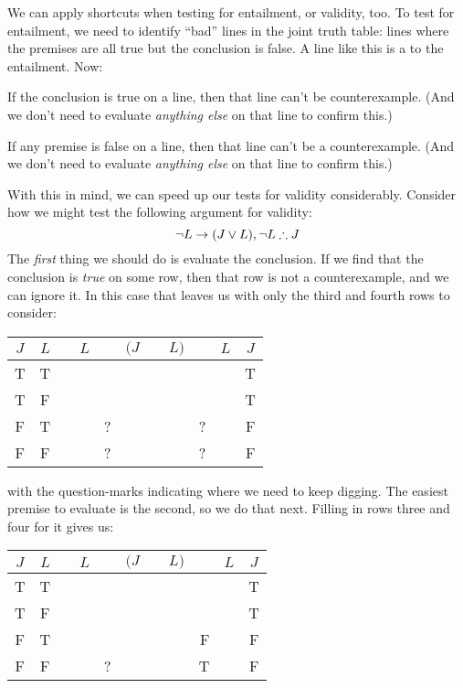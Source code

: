 We can apply shortcuts when testing for entailment, or validity, too. To test for entailment, we need to identify ``bad'' lines in the joint truth table: lines where the premises are all true but the conclusion is false.  A line like this is a  to the entailment. Now:\begin{earg}
	\item[\textbullet] If the conclusion is true on a line, then that line can't be counterexample. (And we don't need to evaluate \emph{anything else} on that line to confirm this.)
	\item[\textbullet] If any premise is false on a line, then that line can't be a counterexample. (And we don't need to evaluate \emph{anything else} on that line to confirm this.)
\end{earg}
With this in mind, we can speed up our tests for validity considerably.  Consider how we might test the following argument for validity:
$$\neg L \rightarrow (J \vee L), \neg L \therefore J$$
The \emph{first} thing we should do is evaluate the conclusion. If we find that the conclusion is \emph{true} on some row, then that row is not a counterexample, and we can ignore it. In this case that leaves us with only the third and fourth rows to consider:
\begin{center}
	\begin{tabular}{c c|d e e e e f |d f|c}
		$J$&$L$&\enot&$L$&\eif&$(J$&\eor&$L)$&\enot&$L$&$J$\\
		\hline
		T & T & &&&&&&&& {T}\\
		T & F & &&&&&&&& {T}\\
		F & T & &&?&&&&?&& {F}\\
		F & F & &&?&&&&?&& {F}
	\end{tabular}
\end{center}
with the question-marks indicating where we need to keep digging. The easiest premise to evaluate is the second, so we do that next.  Filling in rows three and four for it gives us:
\begin{center}
	\begin{tabular}{c c|d e e e e f |d f|c}
		$J$&$L$&\enot&$L$&\eif&$(J$&\eor&$L)$&\enot&$L$&$J$\\
		\hline
		T & T & &&&&&&&& {T}\\
		T & F & &&&&&&&& {T}\\
		F & T & &&&&&&{F}&& {F}\\
		F & F & &&?&&&&{T}&& {F}
	\end{tabular}
\end{center}

